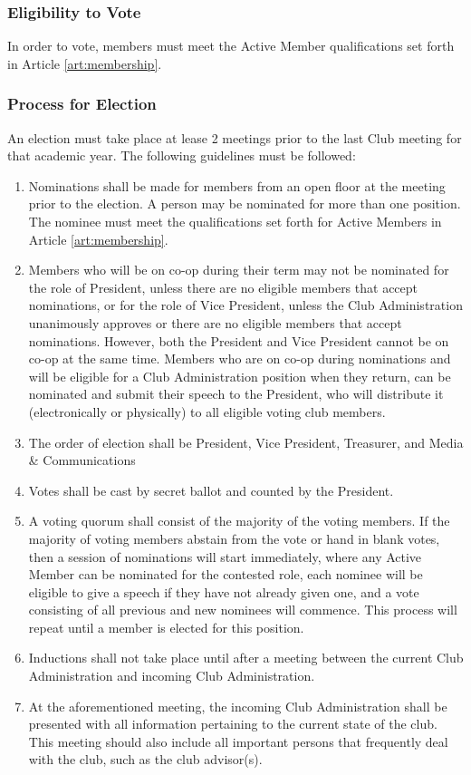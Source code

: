 \documentclass[english,11pt]{article}
\begin{document}
\subsubsection{Eligibility to Vote} \label{subsect:cadmin:selection:eligibility}
In order to vote, members must meet the Active Member qualifications set forth in Article \ref{art:membership}.

\subsubsection{Process for Election} \label{subsect:cadmin:selection:election}
An election must take place at lease 2 meetings prior to the last Club meeting for that academic year. The following guidelines must be followed:

\begin{enumerate}[label=\alph*.]
    \item Nominations shall be made for members from an open floor at the meeting prior to the election.
          A person may be nominated for more than one position. The nominee must meet the qualifications set forth for Active Members in Article \ref{art:membership}.
    \item Members who will be on co-op during their term may not be nominated for the role of President, unless there are no eligible members that accept nominations, or for the role of Vice President, unless the Club Administration unanimously approves or there are no eligible members that accept nominations.
          However, both the President and Vice President cannot be on co-op at the same time.
          Members who are on co-op during nominations and will be eligible for a Club Administration position when they return, can be nominated and submit their speech to the President, who will distribute it (electronically or physically) to all eligible voting club members.
    \item The order of election shall be President, Vice President, Treasurer, and Media \& Communications
    \item Votes shall be cast by secret ballot and counted by the President.
    \item A voting quorum shall consist of the majority of the voting members.
          If the majority of voting members abstain from the vote or hand in blank votes, then a session of nominations will start immediately, where any Active Member can be nominated for the contested role, each nominee will be eligible to give a speech if they have not already given one, and a vote consisting of all previous and new nominees will commence.
          This process will repeat until a member is elected for this position.
    \item Inductions shall not take place until after a meeting between the current Club Administration and incoming Club Administration.
    \item At the aforementioned meeting, the incoming Club Administration shall be presented with all information pertaining to the current state of the club.
          This meeting should also include all important persons that frequently deal with the club, such as the club advisor(s).
\end{enumerate}
\end{document}
